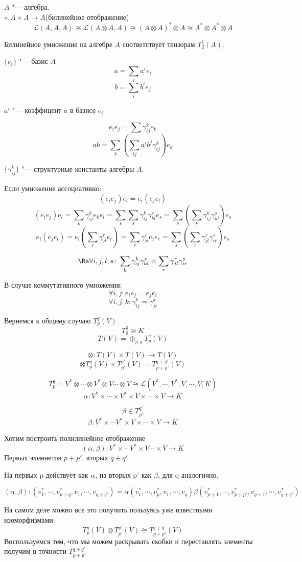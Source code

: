$A$  "--- алгебра.\\
$\circ \colon A \times A \to A$(билинейное отображение)\\
$$\mathcal{L}(A, A, A) \cong \mathcal{L}(A \otimes A, A) \cong (A \otimes A)^* \otimes A \cong A^* \otimes A^* \otimes A$$

Билинейное умножение на алгебре $A$  соответствует тензорам $T_2^1(A)$.

$\{e_i\}$ "--- базис $A$
$$a = \sum_{i} a^i e_i$$
$$b = \sum_{i} b^i e_j$$

$a^i$ "--- коэффицент $a$ в базисе $e_i$

$$e_ie_j = \sum \gamma_{ij}^ke_k$$
$$ab = \sum_{k}(\sum_{ij}a^ib^j\gamma_{ij}^k)e_k$$

\begin{Def}
$\{\gamma_{ij}^k\}$ "--- структурные константы алгебры $A$.
\end{Def}

Если умножение ассоциативно:
    $$(e_ie_j)e_l = e_i(e_je_l)$$
    $$(e_ie_j)e_l = \sum_k\gamma_{ij}^ke_ke_l = \sum_{k}\sum_{s}\gamma_{ij}^k \gamma_{kl}^s e_s = \sum_s(\sum_k \gamma_{ij}^k \gamma_{kl}^s)e_s$$
    $$e_i(e_je_l) = e_i(\sum_r \gamma_{jl}^re_r) = \sum_{r}\gamma_{jl}^{r}e_ie_r = \sum_s(\sum_r \gamma_{jl}^r\gamma_{ir}^s)e_s$$

    $$\Ra \forall i, j, l, s \colon \sum_{k}\gamma_{ij}^k\gamma_{kl}^s = \sum_r\gamma_{jl}^r\gamma_{ir}^s$$

В случае коммутативного умножения:
    $$\forall i, j \colon e_ie_j = e_je_i$$
    $$\forall i, j, k \colon \gamma_{ij}^k = \gamma_{ji}^k$$


Вернемся  к общему случаю $T_p^q(V)$
$$T_0^0 \cong K$$
$$T(V) = \oplus_{p,q}T_{p}^{q}(V)$$

$$\otimes \colon T(V) \times T(V) \to T(V)$$
$$\otimes T_{p}^{q}(V) \times T_{p'}^{q'}(V) = T_{p + p'}^{q + q'}(V)$$

$$T_{p}^{q} = V^* \otimes \cdots \otimes V^* \otimes V \cdots \otimes V \cong \mathcal{L}(V^*, \cdots, V^*, V, \cdots, V, K)$$
$$\alpha\colon V^* \times \cdots \times V^* \times V \times \cdots \times V \to K$$

$$\beta \in T_{p'}^{q'}$$
$$\beta \colon V^* \times \cdots V^* \times V \times \cdots \times V \to K$$ 

Хотим построить полилинейное отображение 
$$(\alpha, \beta)\colon V^* \times \cdots V^* \times V \cdots \times V \to K$$ 
Первых элемнетов $p + p'$, вторых $q + q'$

На первых p действует как $\alpha$, на вторых p' как $\beta$, для q аналогично. 

$$(\alpha, \beta) \colon (v_1^*, \cdots, v_{p + q}^*, v_1, \cdots, v_{q + q'}) = \alpha(v_1^*, \cdots, v_p^*, v_1, \cdots, v_q)\beta(v_{p + 1}^*, \cdots, v_{p + p'}^*, v_{q + 1}, \cdots, v^*_{q + q'})$$

На самом деле можно все это получить пользуясь уже известными изоморфизмами:
    $$T_{p}^q(V) \otimes T_{p'}^{q'}(V) \cong T_{p + p'}^{q + q'}(V)$$
    Воспользуемся тем, что мы можем раскрывать скобки и переставлять элементы получим в точности $T_{p + p'}^{q + q'}$
   